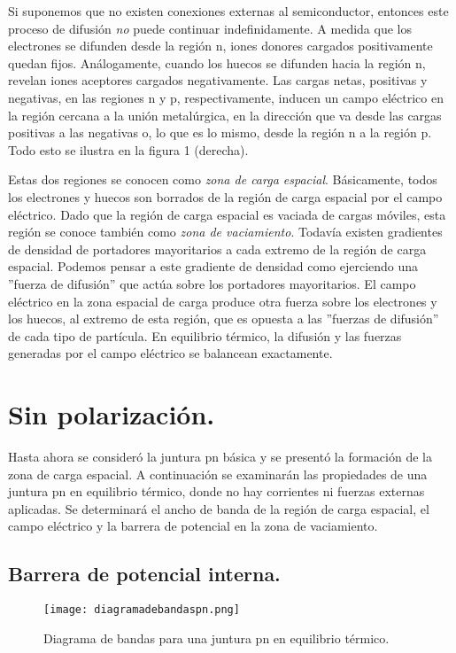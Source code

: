 \documentclass[12pt,a4paper]{article}
\begin{document}
Si suponemos que no existen conexiones externas al semiconductor, entonces este proceso de difusión \emph{no} puede continuar indefinidamente. A medida que los electrones se difunden desde la región n, iones donores cargados positivamente quedan fijos. Análogamente, cuando los huecos se difunden hacia la región n, revelan iones aceptores cargados negativamente. Las cargas netas, positivas y negativas, en las regiones n y p, respectivamente, inducen un campo eléctrico en la región cercana a la unión metalúrgica, en la dirección que va desde las cargas positivas a las negativas o, lo que es lo mismo, desde la región n a la región p. Todo esto se ilustra en la figura 1 (derecha).

Estas dos regiones se conocen como \emph{zona de carga espacial}. Básicamente, todos los electrones y huecos son borrados de la región de carga espacial por el campo eléctrico. Dado que la región de carga espacial es vaciada de cargas móviles, esta región se conoce también como \emph{zona de vaciamiento}. Todavía existen gradientes de densidad de portadores mayoritarios a cada extremo de la región de carga espacial. Podemos pensar a este gradiente de densidad como ejerciendo una ''fuerza de difusión'' que actúa sobre los portadores mayoritarios. El campo eléctrico en la zona espacial de carga produce otra fuerza sobre los electrones y los huecos, al extremo de esta región, que es opuesta a las ''fuerzas de difusión'' de cada tipo de partícula. En equilibrio térmico, la difusión y las fuerzas generadas por el campo eléctrico se balancean exactamente.

\section{Sin polarización.}

Hasta ahora se consideró la juntura pn básica y se presentó la formación de la zona de carga espacial. A continuación se examinarán las propiedades de una juntura pn en equilibrio térmico, donde no hay corrientes ni fuerzas externas aplicadas. Se determinará el ancho de banda de la región de carga espacial, el campo eléctrico y la barrera de potencial en la zona de vaciamiento.

\subsection{Barrera de potencial interna.}

\begin{figure}[ht!]
\begin{center}
\texttt{[image: diagramadebandaspn.png]}
\caption{Diagrama de bandas para una juntura pn en equilibrio térmico.}
\end{center}
\end{figure}
\end{document}

